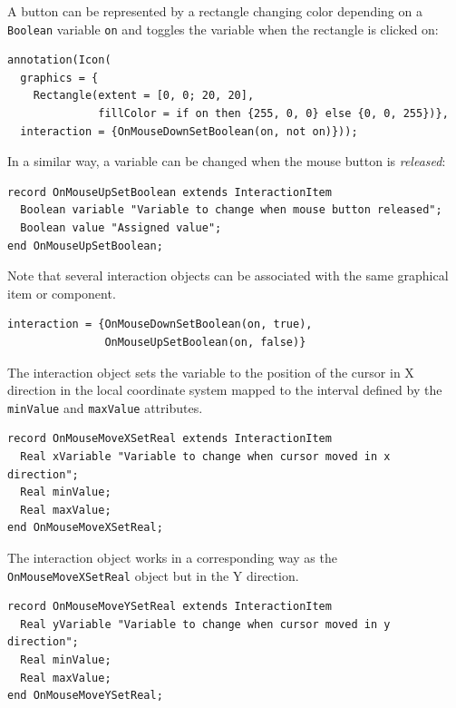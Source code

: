 \begin{example}
A button can be represented by a rectangle changing color depending on a \lstinline!Boolean! variable \lstinline!on! and toggles the variable when the rectangle is clicked on:
\begin{lstlisting}[language=modelica]
annotation(Icon(
  graphics = {
    Rectangle(extent = [0, 0; 20, 20],
              fillColor = if on then {255, 0, 0} else {0, 0, 255})},
  interaction = {OnMouseDownSetBoolean(on, not on)}));
\end{lstlisting}
\end{example}

In a similar way, a variable can be changed when the mouse button is \emph{released}:
\begin{lstlisting}[language=modelica]
record OnMouseUpSetBoolean extends InteractionItem
  Boolean variable "Variable to change when mouse button released";
  Boolean value "Assigned value";
end OnMouseUpSetBoolean;
\end{lstlisting}%

Note that several interaction objects can be associated with the same graphical item or component.
\begin{example}
\begin{lstlisting}[language=modelica]
interaction = {OnMouseDownSetBoolean(on, true),
               OnMouseUpSetBoolean(on, false)}
\end{lstlisting}
\end{example}

The  interaction object sets the variable to the position of the cursor in X direction in the local coordinate system mapped to the interval defined by the \lstinline!minValue! and \lstinline!maxValue! attributes.
\begin{lstlisting}[language=modelica]
record OnMouseMoveXSetReal extends InteractionItem
  Real xVariable "Variable to change when cursor moved in x direction";
  Real minValue;
  Real maxValue;
end OnMouseMoveXSetReal;
\end{lstlisting}

The  interaction object works in a corresponding way as the \lstinline!OnMouseMoveXSetReal! object but in the Y direction.
\begin{lstlisting}[language=modelica]
record OnMouseMoveYSetReal extends InteractionItem
  Real yVariable "Variable to change when cursor moved in y direction";
  Real minValue;
  Real maxValue;
end OnMouseMoveYSetReal;
\end{lstlisting}


